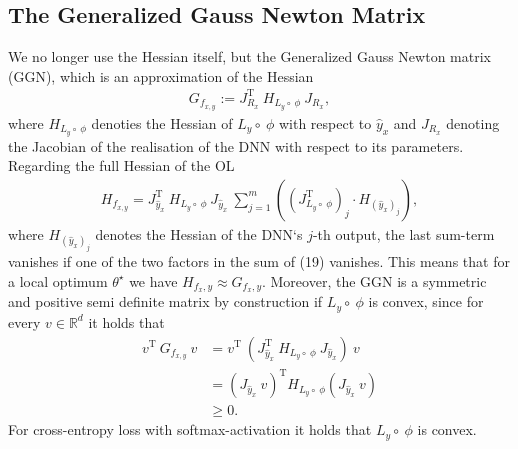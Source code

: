 \documentclass[conference]{IEEEtran}
\begin{document}
	\subsection{The Generalized Gauss Newton Matrix}
	We no longer use the Hessian itself, but the Generalized Gauss Newton matrix (GGN), which is an approximation of the Hessian 
	\begin{align}
	G_{f_{x, y}} := J_{R_{x}}^{\mathrm{T}}\:H_{L_{y}\circ\:\phi}\:J_{R_{x}},
	\end{align}
	where $H_{L_{y}\circ\:\phi}$ denoties the Hessian of $L_{y}\circ\:\phi$ with respect to $\hat{y}_{x}$ and $J_{R_{x}}$ denoting the Jacobian of the realisation of the DNN with respect to its parameters.
	Regarding the full Hessian of the OL
	\begin{align}
	H_{f_{x, y}} = J_{\hat{y}_{x}}^{\mathrm{T}}\:H_{L_{y}\circ\:\phi}\:J_{\hat{y}_{x}}\:\sum_{j = 1}^{m}\left(\left(J_{L_{y}\circ \:\phi}^{\mathrm{T}}\right)_{j}\cdot H_{(\hat{y}_{x})_{j}}\right),
	\end{align}
	where $H_{(\hat{y}_{x})_{j}}$ denotes the Hessian of the DNN`s  $j$-th output, the last sum-term vanishes if one of the two factors in the sum of (19) vanishes.
	This means that for a local optimum $\theta^{\star}$ we have $H_{f_x, y} \approx G_{f_x, y}$.   Moreover, the GGN is a symmetric and positive semi definite matrix by construction if $L_{y}\circ\:\phi$ is convex, since for every $v\in\mathbb{R}^{d}$ it holds that
	\begin{align}
	v^{\mathrm{T}}\:G_{f_{x, y}}\:v &= v^{\mathrm{T}}\:\left( J_{\hat{y}_{x}}^{\mathrm{T}}\:H_{L_{y}\circ\:\phi}\:J_{\hat{y}_{x}}\right)\:v\\
	&= \left(J_{\hat{y}_{x}}\:v\right)^{\mathrm{T}}H_{L_{y}\circ\:\phi}\left(J_{\hat{y}_{x}}\:v\right) \\
	&\geq 0.
	\end{align}
	For cross-entropy loss with softmax-activation it holds that $L_{y}\circ\:\phi$ is convex.
	
\end{document}
